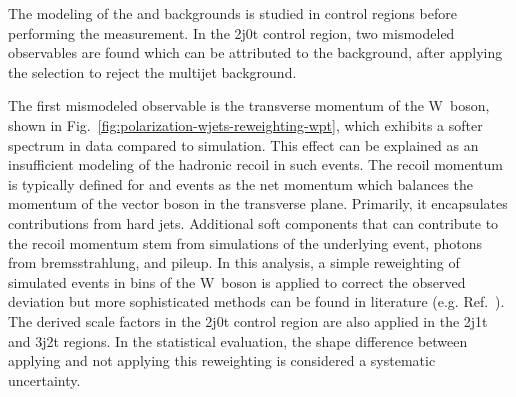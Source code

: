 The modeling of the \wjets and \ttbar backgrounds is studied in control regions before performing the measurement. In the 2j0t control region, two mismodeled observables are found which can be attributed to the \wjets background, after applying the \bdtqcd selection to reject the multijet background. 

The first mismodeled observable is the transverse momentum of the W~boson, shown in Fig.~\ref{fig:polarization-wjets-reweighting-wpt}, which exhibits a softer spectrum in data compared to simulation. This effect can be explained as an insufficient modeling of the hadronic recoil in such events. The recoil momentum is typically defined for \zjets and \wjets events as the net momentum which balances the momentum of the vector boson in the transverse plane. Primarily, it encapsulates contributions from hard jets. Additional soft components that can contribute to the recoil momentum stem from simulations of the underlying event, photons from bremsstrahlung, and pileup. In this analysis, a simple reweighting of simulated \wjets events in bins of the W~boson \pt is applied to correct the observed deviation but more sophisticated methods can be found in literature (e.g. Ref.~\cite{Abazov:2009tra}). The derived scale factors in the 2j0t control region are also applied in the 2j1t and 3j2t regions. In the statistical evaluation, the shape difference between applying and not applying this reweighting is considered a systematic uncertainty.


